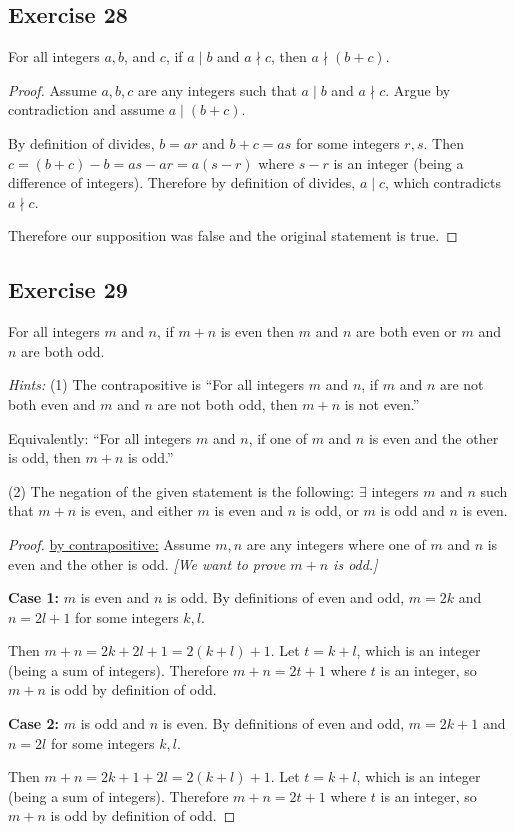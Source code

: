 \documentclass[14pt]{extarticle}
\newcommand{\te}{\exists}
\begin{document}
\subsection{Exercise 28}
For all integers $a, b$, and $c$, if $a \mid b$ and $a \nmid c$, then $a \nmid (b + c)$.

\begin{proof}
Assume $a,b,c$ are any integers such that $a \mid b$ and $a \nmid c$. Argue by contradiction and assume $a \mid (b+c)$.

By definition of divides, $b = ar$ and $b+c = as$ for some integers $r,s$. Then $c = (b+c) - b = as - ar = a(s-r)$ where $s-r$ is an integer (being a difference of integers). Therefore by definition of divides, $a \mid c$, which contradicts $a \nmid c$.

Therefore our supposition was false and the original statement is true.
\end{proof}

\subsection{Exercise 29}
For all integers $m$ and $n$, if $m + n$ is even then $m$
and $n$ are both even or $m$ and $n$ are both odd.

{\it Hints:} (1) The contrapositive is “For all integers $m$ and $n$, if $m$ and $n$ are not both even and $m$ and $n$ are not both odd, then $m + n$ is not even.”

Equivalently: “For all integers $m$ and $n$, if one of $m$ and $n$ is even and the other is odd, then $m + n$ is odd.”

(2) The negation of the given statement is the following:
$\te$ integers $m$ and $n$ such that $m + n$ is even, and either $m$ is even and $n$ is odd, or $m$ is odd and $n$ is even.

\begin{proof}
\underline{by contrapositive:} Assume $m,n$ are any integers where one of $m$ and $n$ is even and the other is odd. {\it [We want to prove $m+n$ is odd.]}

{\bf Case 1:} $m$ is even and $n$ is odd. By definitions of even and odd, $m = 2k$ and $n = 2l+1$ for some integers $k,l$. 

Then $m+n = 2k + 2l+1 = 2(k+l)+1$. Let $t = k+l$, which is an integer (being a sum of integers). Therefore $m+n = 2t+1$ where $t$ is an integer, so $m+n$ is odd by definition of odd.

{\bf Case 2:} $m$ is odd and $n$ is even. By definitions of even and odd, $m = 2k+1$ and $n = 2l$ for some integers $k,l$. 

Then $m+n = 2k + 1 + 2l = 2(k+l)+1$. Let $t = k+l$, which is an integer (being a sum of integers). Therefore $m+n = 2t+1$ where $t$ is an integer, so $m+n$ is odd by definition of odd.
\end{proof}
\end{document}

